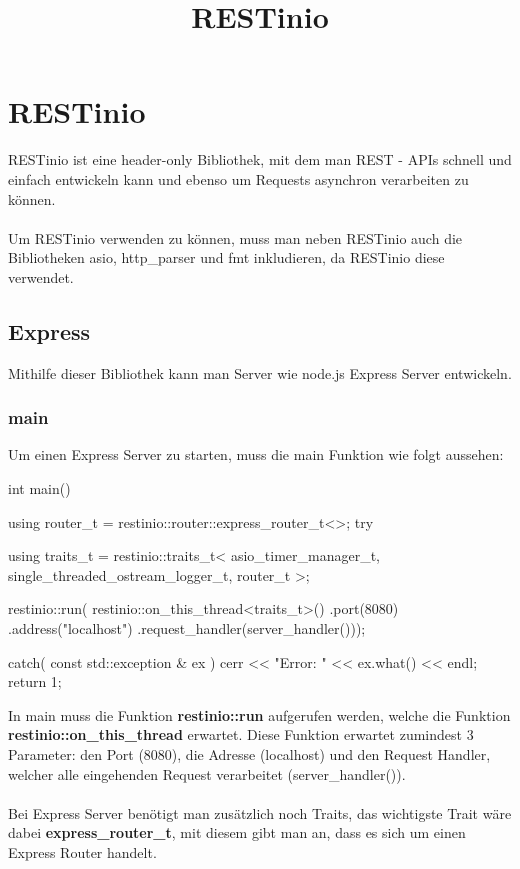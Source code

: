 \documentclass[german,oneside,color]{htldipl}
\begin{document}
\title{RESTinio}

\chapter{RESTinio}
RESTinio ist eine header-only Bibliothek, mit dem man REST - APIs schnell und einfach entwickeln kann und ebenso um Requests asynchron verarbeiten zu können.
\\ \\
Um RESTinio verwenden zu können, muss man neben RESTinio auch die Bibliotheken asio, http\_parser und fmt inkludieren, da RESTinio diese verwendet.

\section{Express}
Mithilfe dieser Bibliothek kann man Server wie node.js Express Server entwickeln. 

\subsection{main}
Um einen Express Server zu starten, muss die main Funktion wie folgt aussehen:
\begin{program}[H]
\begin{JavaCode}
int main() {
    using router_t = restinio::router::express_router_t<>;
    try {
        using traits_t =
            restinio::traits_t<
                asio_timer_manager_t,
                single_threaded_ostream_logger_t,
                router_t >;
				
        restinio::run(
            restinio::on_this_thread<traits_t>()
            .port(8080)
            .address("localhost")
            .request_handler(server_handler()));
    } catch( const std::exception & ex ) {
        cerr << "Error: " << ex.what() << endl;
        return 1;
    }
}
\end{JavaCode}
\end{program}
In main muss die Funktion \textbf{restinio::run} aufgerufen werden, welche die Funktion \textbf{restinio::on\_this\_thread} erwartet. Diese Funktion erwartet zumindest 3 Parameter: den Port (8080), die Adresse (localhost) und den Request Handler, welcher alle eingehenden Request verarbeitet (server\_handler()). 
\\ \\
Bei Express Server benötigt man zusätzlich noch Traits, das wichtigste Trait wäre dabei \textbf{express\_router\_t}, mit diesem gibt man an, dass es sich um einen Express Router handelt.
\end{document}
